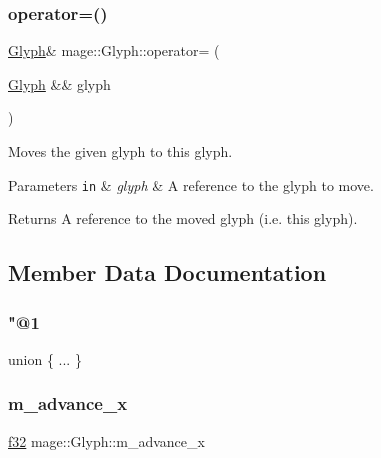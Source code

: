 \subsubsection{\texorpdfstring{operator=()}{operator=()}\hspace{0.1cm}{\footnotesize\ttfamily [2/2]}}
{\footnotesize\ttfamily \hyperlink{structmage_1_1_glyph}{Glyph}\& mage\+::\+Glyph\+::operator= (\begin{DoxyParamCaption}\item[{\hyperlink{structmage_1_1_glyph}{Glyph} \&\&}]{glyph }\end{DoxyParamCaption})\hspace{0.3cm}{\ttfamily [default]}}

Moves the given glyph to this glyph.


\begin{DoxyParams}[1]{Parameters}
\mbox{\tt in}  & {\em glyph} & A reference to the glyph to move. \\
\hline
\end{DoxyParams}
\begin{DoxyReturn}{Returns}
A reference to the moved glyph (i.\+e. this glyph). 
\end{DoxyReturn}


\subsection{Member Data Documentation}
\hypertarget{structmage_1_1_glyph_aa38d552d3a79706060b5dde53bd38881}{}\label{structmage_1_1_glyph_aa38d552d3a79706060b5dde53bd38881} 
\subsubsection{\texorpdfstring{"@1}{@1}}
{\footnotesize\ttfamily union \{ ... \} }

\hypertarget{structmage_1_1_glyph_a226a77fa6bfc70b230cf0d5cc377195a}{}\label{structmage_1_1_glyph_a226a77fa6bfc70b230cf0d5cc377195a} 
\subsubsection{\texorpdfstring{m\+\_\+advance\+\_\+x}{m\_advance\_x}}
{\footnotesize\ttfamily \hyperlink{namespacemage_a6a44ad388483959dc4dff9f2aef91431}{f32} mage\+::\+Glyph\+::m\+\_\+advance\+\_\+x}

